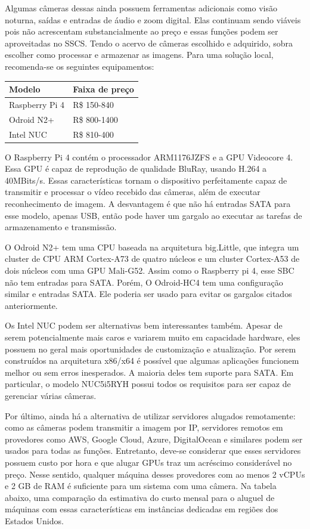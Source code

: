 \documentclass[12pt, %
openright, 
oneside, %
a4paper,    %
brazil]{facom-ufu-abntex2}
\begin{document}
Algumas câmeras dessas ainda possuem ferramentas adicionais como visão noturna,
saídas e entradas de áudio e zoom digital. Elas continuam sendo viáveis pois
não acrescentam substancialmente ao preço e essas funções podem ser
aproveitadas no SSCS. Tendo o acervo de câmeras escolhido e adquirido, sobra
escolher como processar e  armazenar as imagens. Para uma solução local,
recomenda-se os seguintes equipamentos:

\begin{center}
	\begin{tabular}{|l|l|}
		\hline
		Modelo         & Faixa de preço
		\\ \hline
		Raspberry Pi 4 & R\$ 150-840
		\\ \hline
		Odroid N2+     & R\$ 800-1400
		\\ \hline
		Intel NUC      & R\$ 810-400
		\\ \hline
	\end{tabular}
\end{center}

O Raspberry Pi 4 contém o processador ARM1176JZFS e a GPU Videocore 4. Essa GPU
é capaz de reprodução de qualidade BluRay, usando H.264 a 40MBits/s. Essas
características tornam o dispositivo perfeitamente capaz de transmitir e
processar o vídeo recebido das câmeras, além de executar reconhecimento de
imagem. A desvantagem é que não há entradas SATA para esse modelo, apenas USB,
então pode haver um gargalo ao executar as tarefas de armazenamento e
transmissão.

O Odroid N2+ tem uma CPU baseada na arquitetura big.Little, que integra um
cluster de CPU ARM Cortex-A73  de quatro núcleos e um cluster Cortex-A53 de
dois núcleos com uma GPU Mali-G52. Assim como o Raspberry pi 4, esse SBC não
tem entradas para SATA. Porém, O Odroid-HC4 tem uma configuração similar e
entradas SATA. Ele poderia ser usado para evitar os gargalos citados
anteriormente.

Os Intel NUC podem ser alternativas bem interessantes também. Apesar de serem
potencialmente mais caros e variarem muito em capacidade hardware, eles possuem
no geral mais oportunidades de customização e atualização. Por serem
construídos na arquitetura x86/x64 é possível que algumas aplicações funcionem
melhor ou sem erros inesperados. A maioria deles tem suporte para SATA. Em
particular, o modelo NUC5i5RYH possui todos os requisitos para ser capaz de
gerenciar várias câmeras.

Por último, ainda há a alternativa de utilizar servidores alugados remotamente:
como as câmeras podem transmitir a imagem por IP, servidores remotos em
provedores como AWS, Google Cloud, Azure, DigitalOcean e similares podem ser
usados para todas as funções. Entretanto, deve-se considerar que esses
servidores possuem custo por hora e que alugar GPUs  traz um acréscimo
considerável no preço. Nesse sentido, qualquer máquina desses provedores com ao
menos 2 vCPUs e 2 GB de RAM é suficiente para um sistema com uma câmera. Na
tabela abaixo, uma comparação da estimativa do custo mensal para o aluguel de
máquinas com essas características em instâncias dedicadas em regiões dos
Estados Unidos.
\end{document}
